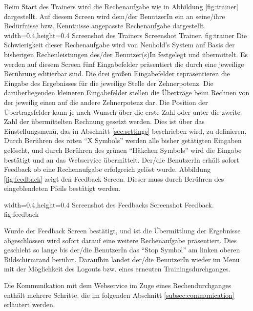 Beim Start des Trainers wird die Rechenaufgabe wie in Abbildung \ref{fig:trainer} dargestellt. Auf diesem
Screen wird dem/der BenutzerIn ein an seine/ihre Bedürfnisse bzw. Kenntnisse angepasste Rechenaufgabe
dargestellt.
  {width=0.4\textwidth,height=0.4\textheight}%
  {Screenshot des Trainers}%
  {Screenshot Trainer.}%
  {fig:trainer}%
Die Schwierigkeit dieser Rechenaufgabe wird von Neuhold's System auf Basis der bisherigen
Rechenleistungen des/der Benutzer(s)In festgelegt und übermittelt. Es werden auf diesem Screen fünf Eingabefelder
präsentiert die durch eine jeweilige Berührung editierbar sind. Die drei großen Eingabefelder repräsentieren
die Eingabe des Ergebnisses für die jeweilige Stelle der Zehnerpotenz. Die darüberliegenden kleineren
Eingabefelder stellen die Überträge beim Rechnen von der jeweilig einen auf die andere Zehnerpotenz dar.
Die Position der Übertragsfelder kann je nach Wunsch über die erste Zahl oder unter die zweite Zahl der übermittelten Rechnung 
gesetzt werden. Dies ist über das Einstellungsmenü, das in Abschnitt \ref{sec:settings} beschrieben
wird, zu definieren. Durch Berühren des roten \enquote{X Symbols} werden
alle bisher getätigten Eingaben gelöscht, und durch Berühren des grünen \enquote{Häkchen Symbols} wird die Eingabe 
bestätigt und an das Webservice übermittelt. Der/die BenutzerIn erhält sofort Feedback ob eine Rechenaufgabe
erfolgreich gelöst wurde. Abbildung \ref{fig:feedback} zeigt den Feedback Screen. Dieser muss durch
Berühren des eingeblendeten Pfeils bestätigt werden.


  {width=0.4\textwidth,height=0.4\textheight}%
  {Screenshot des Feedbacks}%
  {Screenshot Feedback.}%
  {fig:feedback}%

Wurde der Feedback Screen bestätigt, und ist die Übermittlung der Ergebnisse abgeschlossen wird sofort darauf 
eine weitere Rechenaufgabe präsentiert. Dies geschieht so lange bis der/die BenutzerIn das \enquote{Stop Symbol}
am linken oberen Bildschirmrand berührt. 
Daraufhin landet der/die BenutzerIn wieder im Menü mit der Möglichkeit des Logouts bzw. eines erneuten 
Trainingsdurchganges.

Die Kommunikation mit dem Webservice im Zuge eines Rechendurchganges enthält mehrere Schritte, die im folgenden 
Abschnitt \ref{subsec:communication} erläutert werden. 

